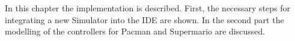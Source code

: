 
In this chapter the implementation is described. First, the necessary steps for integrating a new Simulator into the IDE are shown. In the second part the modelling of the controllers for Pacman and Supermario are discussed.




